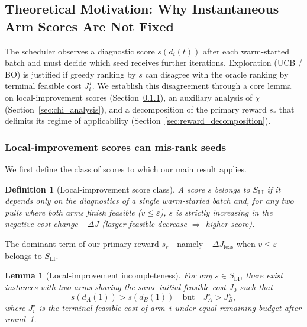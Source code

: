 \documentclass[lettersize,journal]{IEEEtran}
\newtheorem{definition}{Definition}
\newtheorem{lemma}{Lemma}
\begin{document}
\subsection{Theoretical Motivation: Why Instantaneous Arm Scores Are Not Fixed}
\label{sec:theory_ranking}

The scheduler observes a diagnostic score $s(d_i(t))$ after each warm-started batch and must decide which seed receives further iterations. Exploration (UCB / BO) is justified if greedy ranking by $s$ can disagree with the oracle ranking by terminal feasible cost $J_i^\star$. We establish this disagreement through a core lemma on local-improvement scores (Section~\ref{sec:li_incompleteness}), an auxiliary analysis of $\chi$ (Section~\ref{sec:chi_analysis}), and a decomposition of the primary reward $s_r$ that delimits its regime of applicability (Section~\ref{sec:reward_decomposition}).

\subsubsection{Local-improvement scores can mis-rank seeds}
\label{sec:li_incompleteness}

We first define the class of scores to which our main result applies.

\begin{definition}[Local-improvement score class]
\label{def:li_scores}
A score $s$ belongs to $S_{\mathrm{LI}}$ if it depends only on the diagnostics of a single warm-started batch and, for any two pulls where both arms finish feasible ($v \le \varepsilon$), $s$ is strictly increasing in the negative cost change $-\Delta J$ (larger feasible decrease $\Rightarrow$ higher score).
\end{definition}

The dominant term of our primary reward $s_r$---namely $-\Delta J_{\mathrm{feas}}$ when $v \le \varepsilon$---belongs to $S_{\mathrm{LI}}$.

\begin{lemma}[Local-improvement incompleteness]
\label{lem:li_incompleteness}
For any $s \in S_{\mathrm{LI}}$, there exist instances with two arms sharing the same initial feasible cost $J_0$ such that
\[
s(d_A(1)) > s(d_B(1)) \quad\text{but}\quad J_A^\star > J_B^\star,
\]
where $J_i^\star$ is the terminal feasible cost of arm~$i$ under equal remaining budget after round~1.
\end{lemma}
\end{document}
